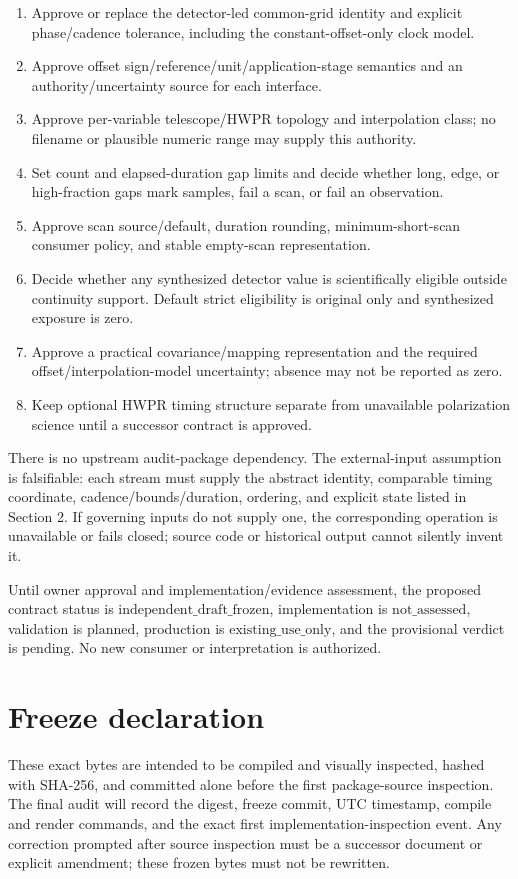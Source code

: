\documentclass[11pt]{article}
\newcommand{\state}[1]{\mathrm{#1}}
\begin{document}
\begin{enumerate}[label=OD\arabic*.,leftmargin=2.5em]
\item Approve or replace the detector-led common-grid identity and explicit
phase/cadence tolerance, including the constant-offset-only clock model.
\item Approve offset sign/reference/unit/application-stage semantics and an
authority/uncertainty source for each interface.
\item Approve per-variable telescope/HWPR topology and interpolation class;
no filename or plausible numeric range may supply this authority.
\item Set count and elapsed-duration gap limits and decide whether long,
edge, or high-fraction gaps mark samples, fail a scan, or fail an observation.
\item Approve scan source/default, duration rounding, minimum-short-scan
consumer policy, and stable empty-scan representation.
\item Decide whether any synthesized detector value is scientifically
eligible outside continuity support.  Default strict eligibility is original
only and synthesized exposure is zero.
\item Approve a practical covariance/mapping representation and the required
offset/interpolation-model uncertainty; absence may not be reported as zero.
\item Keep optional HWPR timing structure separate from unavailable
polarization science until a successor contract is approved.
\end{enumerate}

There is no upstream audit-package dependency.  The external-input assumption
is falsifiable: each stream must supply the abstract identity, comparable
timing coordinate, cadence/bounds/duration, ordering, and explicit state
listed in Section 2.  If governing inputs do not supply one, the corresponding
operation is unavailable or fails closed; source code or historical output
cannot silently invent it.

Until owner approval and implementation/evidence assessment, the proposed
contract status is \(\state{independent\_draft\_frozen}\), implementation is
\(\state{not\_assessed}\), validation is \(\state{planned}\), production is
\(\state{existing\_use\_only}\), and the provisional verdict is
\(\state{pending}\).  No new consumer or interpretation is authorized.

\section{Freeze declaration}

These exact bytes are intended to be compiled and visually inspected, hashed
with SHA-256, and committed alone before the first package-source inspection.
The final audit will record the digest, freeze commit, UTC timestamp, compile
and render commands, and the exact first implementation-inspection event.
Any correction prompted after source inspection must be a successor document
or explicit amendment; these frozen bytes must not be rewritten.
\end{document}
